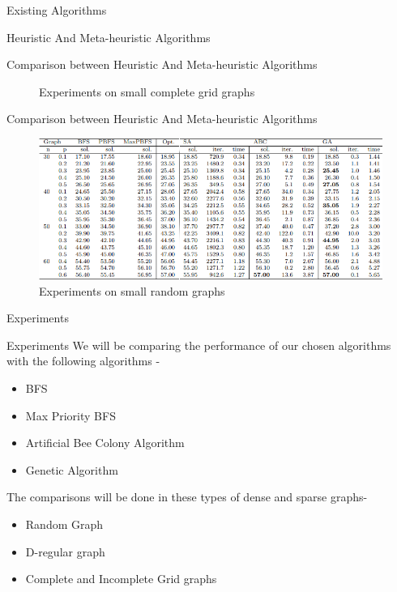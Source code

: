 \documentclass[xcolor=svgnames]{beamer}
\begin{document}
\begin{section}{Existing Algorithms}
\begin{subsection}{Heuristic And Meta-heuristic Algorithms}
\begin{frame}{Comparison between Heuristic And Meta-heuristic Algorithms}
\begin{figure}
                \caption{Experiments on small complete grid graphs\cite{bruggemanndevelopment}}
                \label{fig:enter-label}
            \end{figure}
        \end{frame}
        \begin{frame}{Comparison between Heuristic And Meta-heuristic Algorithms}
            \begin{figure}
                \centering
                \includegraphics[width=\linewidth]{Screenshot_20241020_034159.png}
                \caption{Experiments on small random graphs\cite{bruggemanndevelopment}}
                \label{fig:enter-label}
            \end{figure}
        \end{frame}
    \end{subsection}
\end{section}

\begin{section}{Experiments}
    \begin{frame}{Experiments}
        We will be comparing the performance of our chosen algorithms with the following algorithms -
        \begin{itemize}
            \item BFS
            \item Max Priority BFS
            \item Artificial Bee Colony Algorithm
            \item Genetic Algorithm
        \end{itemize}
        The comparisons will be done in these types of dense and sparse graphs-
        \begin{itemize}
            \item Random Graph
            \item D-regular graph
            \item Complete and Incomplete Grid graphs
        \end{itemize}
    \end{frame}
\end{section}
\end{document}
